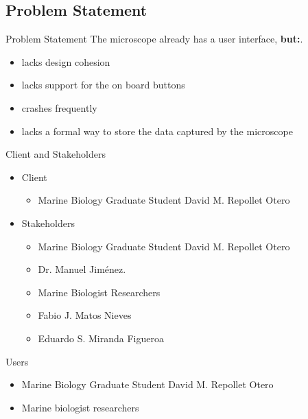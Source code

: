 \documentclass[14pt, aspectratio=169]{beamer}
\begin{document}
\subsection{Problem Statement}
\begin{frame}{Problem Statement}
	The microscope already has a user interface, \large\textbf{but:}\textnormal.
	\begin{itemize}
		\item lacks design cohesion
		\item lacks support for the on board buttons
		\item crashes frequently
		\item lacks a formal way to store the data captured by the microscope
	\end{itemize}
\end{frame}
\begin{frame}{Client and Stakeholders}
	\begin{itemize}
		\item Client
		      \begin{itemize}
			      \item Marine Biology Graduate Student David M. Repollet Otero
		      \end{itemize}
		\item Stakeholders
		      \begin{itemize}
			      \item Marine Biology Graduate Student David M. Repollet Otero
			      \item Dr. Manuel Jiménez.
			      \item Marine Biologist Researchers
			      \item Fabio J. Matos Nieves
			      \item Eduardo S. Miranda Figueroa
		      \end{itemize}
	\end{itemize}
\end{frame}
\begin{frame}{Users}
	\begin{itemize}
		\item Marine Biology Graduate Student David M. Repollet Otero
		\item Marine biologist researchers
	\end{itemize}
\end{frame}
\end{document}
